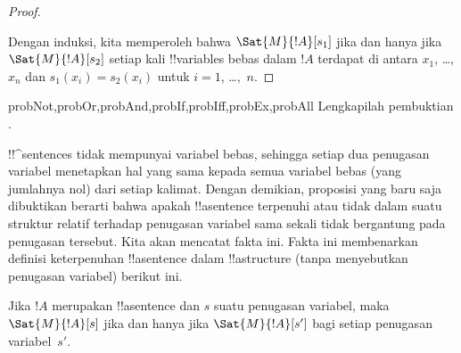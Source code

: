 \documentclass[../../../include/open-logic-section]{subfiles}
\begin{document}
\begin{proof}
\begin{enumerate}
\end{enumerate}
Dengan induksi, kita memperoleh bahwa $\Sat{M}{!A}[s_1]$ jika dan hanya jika
$\Sat{M}{!A}[s_2]$ setiap kali !!{variable}s bebas dalam $!A$ terdapat di
antara $x_1$, \dots, $x_n$ dan $s_1(x_i)=s_2(x_i)$ untuk
$i = 1$, \dots,~$n$.
\end{proof}

\begin{probtag}{probNot,probOr,probAnd,probIf,probIff,probEx,probAll}
Lengkapilah pembuktian .
\end{probtag}

\begin{explain}
!!^{sentence}s tidak mempunyai variabel bebas, sehingga setiap dua
penugasan variabel menetapkan hal yang sama kepada semua variabel bebas
(yang jumlahnya nol) dari setiap kalimat. Dengan demikian, proposisi yang
baru saja dibuktikan berarti bahwa apakah !!a{sentence} terpenuhi atau tidak
dalam suatu struktur relatif terhadap penugasan variabel sama sekali tidak
bergantung pada penugasan tersebut. Kita akan mencatat fakta ini. Fakta ini
membenarkan definisi keterpenuhan !!a{sentence} dalam !!a{structure} (tanpa
menyebutkan penugasan variabel) berikut ini.
\end{explain}

\begin{cor}
Jika $!A$ merupakan !!a{sentence} dan $s$ suatu penugasan variabel, maka
$\Sat{M}{!A}[s]$ jika dan hanya jika $\Sat{M}{!A}[s']$ bagi setiap
penugasan variabel~$s'$.
\end{cor}
\end{document}
